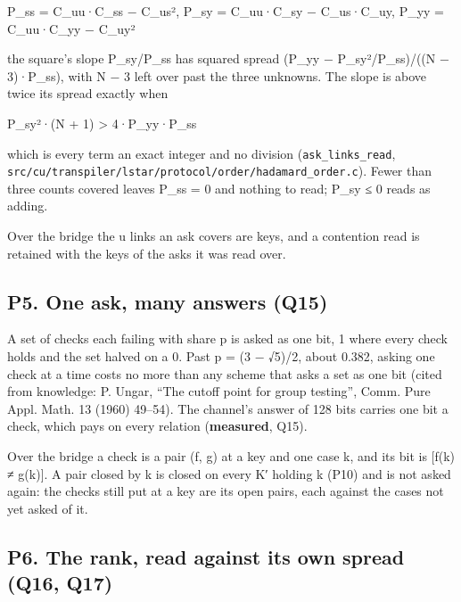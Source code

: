 P\_\allowbreak{}ss = C\_\allowbreak{}uu·C\_\allowbreak{}ss − C\_\allowbreak{}us²,  P\_\allowbreak{}sy = C\_\allowbreak{}uu·C\_\allowbreak{}sy − C\_\allowbreak{}us·C\_\allowbreak{}uy,  P\_\allowbreak{}yy = C\_\allowbreak{}uu·C\_\allowbreak{}yy − C\_\allowbreak{}uy²

the square's slope P\_\allowbreak{}sy/P\_\allowbreak{}ss has squared spread (P\_\allowbreak{}yy − P\_\allowbreak{}sy²/P\_\allowbreak{}ss)/((N − 3)·P\_\allowbreak{}ss), with N − 3 left over past the three unknowns. The slope is above twice its spread exactly when

P\_\allowbreak{}sy²·(N + 1) > 4·P\_\allowbreak{}yy·P\_\allowbreak{}ss

which is every term an exact integer and no division (\texttt{ask\_\allowbreak{}links\_\allowbreak{}read}, \texttt{src/\allowbreak{}cu/\allowbreak{}transpiler/\allowbreak{}lstar/\allowbreak{}protocol/\allowbreak{}order/\allowbreak{}hadamard\_\allowbreak{}order.\allowbreak{}c}). Fewer than three counts covered leaves P\_\allowbreak{}ss = 0 and nothing to read; P\_\allowbreak{}sy ≤ 0 reads as adding.

Over the bridge the u links an ask covers are keys, and a contention read is retained with the keys of the asks it was read over.

\subsection{\texorpdfstring{P5. One ask, many answers (Q15)}{P5. One ask, many answers (Q15)}}

A set of checks each failing with share p is asked as one bit, 1 where every check holds and the set halved on a 0. Past p = (3 − √5)/2, about 0.382, asking one check at a time costs no more than any scheme that asks a set as one bit (cited from knowledge: P. Ungar, “The cutoff point for group testing”, Comm. Pure Appl. Math. 13 (1960) 49–54). The channel's answer of 128 bits carries one bit a check, which pays on every relation (\textbf{measured}, Q15).

Over the bridge a check is a pair (f, g) at a key and one case k, and its bit is [f(k) ≠ g(k)]. A pair closed by k is closed on every K′ holding k (P10) and is not asked again: the checks still put at a key are its open pairs, each against the cases not yet asked of it.

\subsection{\texorpdfstring{P6. The rank, read against its own spread (Q16, Q17)}{P6. The rank, read against its own spread (Q16, Q17)}}


